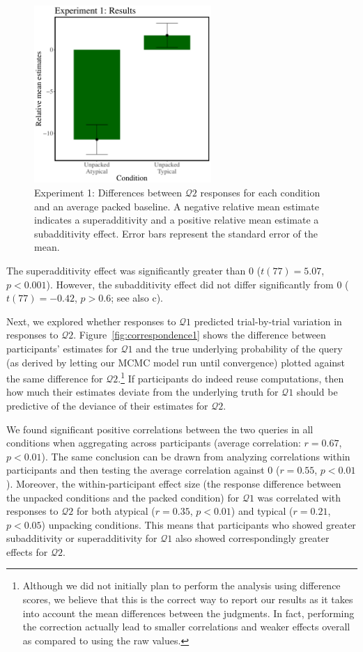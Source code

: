 \begin{figure}
\centering
\includegraphics[width=0.6\textwidth]{figures/amo1results.pdf}
\caption{Experiment 1: Differences between $\mathcal{Q}2$ responses for each condition and an average packed baseline. A negative relative mean estimate indicates a superadditivity and a positive relative mean estimate a subadditivity effect. Error bars represent the standard error of the mean.}
\label{fig:meandiffs1}
\end{figure}

The superadditivity effect was significantly greater than 0 ($t(77)=5.07$, $p<0.001$). However, the subadditivity effect did not differ significantly from 0 ($t(77)=-0.42$, $p>0.6$; see also c\citet{dasgupta2017hypotheses}).

Next, we explored whether responses to $\mathcal{Q}1$ predicted trial-by-trial variation in responses to $\mathcal{Q}2$. Figure~\ref{fig:correspondence1} shows the difference between participants' estimates for $\mathcal{Q}1$ and the true underlying probability of the query (as derived by letting our MCMC model run until convergence) plotted against the same difference for $\mathcal{Q}2$.\footnote{Although we did not initially plan to perform the analysis using difference scores, we believe that this is the correct way to report our results as it takes into account the mean differences between the judgments. In fact, performing the correction actually lead to smaller correlations and weaker effects overall as compared to using the raw values.} If participants do indeed reuse computations, then how much their estimates deviate from the underlying truth for $\mathcal{Q}1$ should be predictive of the deviance of their estimates for $\mathcal{Q}2$.

We found significant positive correlations between the two queries in all conditions when aggregating across participants (average correlation: $r=0.67$, $p<0.01$). The same conclusion can be drawn from analyzing correlations within participants and then testing the average correlation against 0 ($r=0.55$, $p<0.01$). Moreover, the within-participant effect size (the response difference between the unpacked conditions and the packed condition) for $\mathcal{Q}1$ was correlated with responses to $\mathcal{Q}2$ for both atypical ($r=0.35$, $p<0.01$) and typical ($r=0.21$, $p<0.05$) unpacking conditions. This means that participants who showed greater subadditivity or superadditivity for $\mathcal{Q}1$ also showed correspondingly greater effects for $\mathcal{Q}2$.

